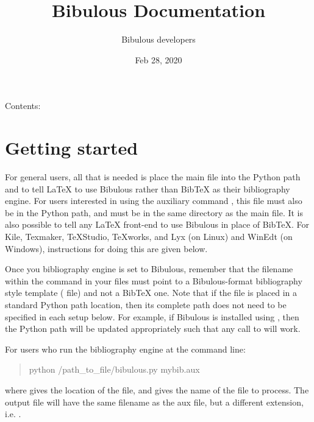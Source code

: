 \documentclass[letterpaper,10pt,english]{sphinxmanual}
\title{Bibulous Documentation}
\date{Feb 28, 2020}
\author{Bibulous developers}
\begin{document}
\maketitle
\sphinxtableofcontents
{}\label{\detokenize{index::doc}}


Contents:


\chapter{Getting started}
\label{\detokenize{getting_started:getting-started}}\label{\detokenize{getting_started::doc}}
For general users, all that is needed is place the main  file into the Python path and to tell LaTeX to use Bibulous rather than BibTeX as their bibliography engine. For users interested in using the auxiliary command , this file must also be in the Python path, and must be in the same directory as the main file. It is also possible to tell any LaTeX front-end to use Bibulous in place of BibTeX. For Kile, Texmaker, TeXStudio, TeXworks, and Lyx (on Linux) and WinEdt (on Windows), instructions for doing this are given below.

Once you bibliography engine is set to Bibulous, remember that the filename within the  command in your  files must point to a Bibulous-format bibliography style template ( file) and not a BibTeX one. Note that if the  file is placed in a standard Python path location, then its complete path does not need to be specified in each setup below. For example, if Bibulous is installed using , then the Python path will be updated appropriately such that any call to  will work.

For users who run the bibliography engine at the command line:
\begin{quote}

python /path\_to\_file/bibulous.py mybib.aux
\end{quote}

where  gives the location of the  file, and  gives the name of the file to process. The output file will have the same filename as the aux file, but a different extension, i.e. .
\end{document}
